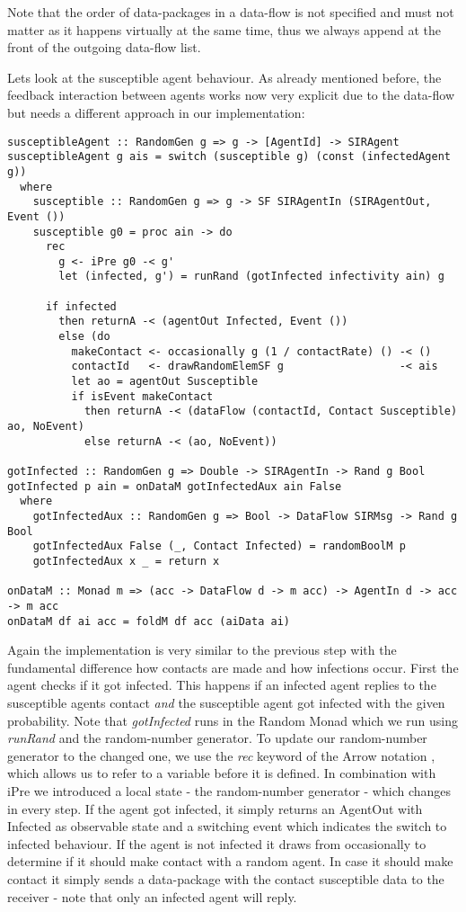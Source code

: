 Note that the order of data-packages in a data-flow is not specified and must not matter as it happens virtually at the same time, thus we always append at the front of the outgoing data-flow list.

Lets look at the susceptible agent behaviour. As already mentioned before, the feedback interaction between agents works now very explicit due to the data-flow but needs a different approach in our implementation:

\begin{verbatim}
susceptibleAgent :: RandomGen g => g -> [AgentId] -> SIRAgent
susceptibleAgent g ais = switch (susceptible g) (const (infectedAgent g))
  where
    susceptible :: RandomGen g => g -> SF SIRAgentIn (SIRAgentOut, Event ())
    susceptible g0 = proc ain -> do
      rec
        g <- iPre g0 -< g'
        let (infected, g') = runRand (gotInfected infectivity ain) g

      if infected 
        then returnA -< (agentOut Infected, Event ())
        else (do
          makeContact <- occasionally g (1 / contactRate) () -< ()
          contactId   <- drawRandomElemSF g                  -< ais
          let ao = agentOut Susceptible
          if isEvent makeContact
            then returnA -< (dataFlow (contactId, Contact Susceptible) ao, NoEvent)
            else returnA -< (ao, NoEvent))
            
gotInfected :: RandomGen g => Double -> SIRAgentIn -> Rand g Bool
gotInfected p ain = onDataM gotInfectedAux ain False
  where
    gotInfectedAux :: RandomGen g => Bool -> DataFlow SIRMsg -> Rand g Bool
    gotInfectedAux False (_, Contact Infected) = randomBoolM p
    gotInfectedAux x _ = return x
    
onDataM :: Monad m => (acc -> DataFlow d -> m acc) -> AgentIn d -> acc -> m acc
onDataM df ai acc = foldM df acc (aiData ai)
\end{verbatim}

Again the implementation is very similar to the previous step with the fundamental difference how contacts are made and how infections occur. First the agent checks if it got infected. This happens if an infected agent replies to the susceptible agents contact \textit{and} the susceptible agent got infected with the given probability. Note that \textit{gotInfected} runs in the Random Monad which we run using \textit{runRand} and the random-number generator. To update our random-number generator to the changed one, we use the \textit{rec} keyword of the Arrow notation \cite{paterson_new_2001}, which allows us to refer to a variable before it is defined. In combination with iPre we introduced a local state - the random-number generator - which changes in every step.
If the agent got infected, it simply returns an AgentOut with Infected as observable state and a switching event which indicates the switch to infected behaviour.
If the agent is not infected it draws from occasionally to determine if it should make contact with a random agent. In case it should make contact it simply sends a data-package with the contact susceptible data to the receiver - note that only an infected agent will reply.

